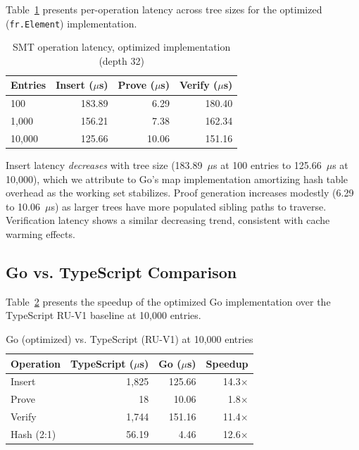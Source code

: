 Table~\ref{tab:smt-latency} presents per-operation latency across
tree sizes for the optimized (\texttt{fr.Element}) implementation.

\begin{table}[h]
\centering
\caption{SMT operation latency, optimized implementation (depth 32)}
\label{tab:smt-latency}
\begin{tabular}{lrrr}
\toprule
\textbf{Entries} & \textbf{Insert ($\mu$s)} & \textbf{Prove ($\mu$s)} & \textbf{Verify ($\mu$s)} \\
\midrule
100    & 183.89 & 6.29  & 180.40 \\
1,000  & 156.21 & 7.38  & 162.34 \\
10,000 & 125.66 & 10.06 & 151.16 \\
\bottomrule
\end{tabular}
\end{table}

Insert latency \textit{decreases} with tree size (183.89~$\mu$s at
100 entries to 125.66~$\mu$s at 10,000), which we attribute to Go's
map implementation amortizing hash table overhead as the working set
stabilizes. Proof generation increases modestly (6.29 to 10.06~$\mu$s)
as larger trees have more populated sibling paths to traverse.
Verification latency shows a similar decreasing trend, consistent
with cache warming effects.

\subsection{Go vs. TypeScript Comparison}

Table~\ref{tab:go-vs-ts} presents the speedup of the optimized Go
implementation over the TypeScript RU-V1 baseline at 10,000 entries.

\begin{table}[h]
\centering
\caption{Go (optimized) vs. TypeScript (RU-V1) at 10,000 entries}
\label{tab:go-vs-ts}
\begin{tabular}{lrrr}
\toprule
\textbf{Operation} & \textbf{TypeScript ($\mu$s)} & \textbf{Go ($\mu$s)} & \textbf{Speedup} \\
\midrule
Insert     & 1,825 & 125.66 & 14.3$\times$ \\
Prove      & 18    & 10.06  & 1.8$\times$ \\
Verify     & 1,744 & 151.16 & 11.4$\times$ \\
Hash (2:1) & 56.19 & 4.46   & 12.6$\times$ \\
\bottomrule
\end{tabular}
\end{table}

